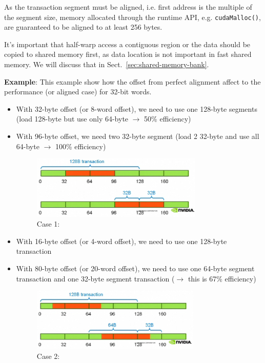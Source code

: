 \begin{framed}
  As the transaction segment must be aligned, i.e. first address is
  the multiple of the segment size, memory allocated through the
  runtime API, e.g. \verb!cudaMalloc()!, are guaranteed to be aligned
  to at least 256 bytes. 

  It's important that half-warp access a contiguous region or the data
  should be copied to shared memory first, as data location is not
  important in fast shared memory. We will discuss that in
  Sect.~\ref{sec:shared-memory-bank}.

\end{framed}

{\bf Example}: This example show how the offset from perfect alignment
affect to the performance (or aligned case) for 32-bit words. 
\begin{itemize}
\item With 32-byte offset (or 8-word offset), we need to use one
  128-byte segments (load 128-byte but use only 64-byte $\rightarrow$
  50\% efficiency)
\item With 96-byte offset, we need two 32-byte segment  (load 2
  32-byte and use all 64-byte $\rightarrow$ 100\% efficiency)
  \begin{figure}[hbt]
    \centerline{\includegraphics[height=3cm,
      angle=0]{./images/aligned_case1.eps}}
    \caption{Case 1: }
    \label{fig:aligned_offset_1}
  \end{figure}

\item With 16-byte offset (or 4-word offset), we need to use one
  128-byte transaction
\item With 80-byte offset (or 20-word offset), we need to use one
  64-byte segment transaction and one 32-byte segment transaction
  ($\rightarrow$ this is 67\% efficiency)

  \begin{figure}[hbt]
    \centerline{\includegraphics[height=3cm,
      angle=0]{./images/aligned_case2.eps}}
    \caption{Case 2: }
    \label{fig:aligned_offset_2}
  \end{figure}

\end{itemize}


